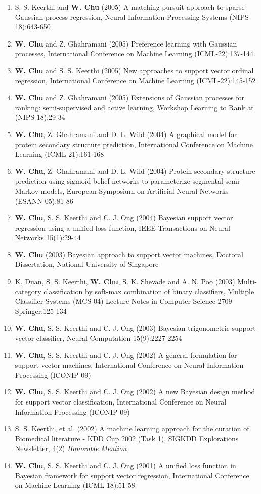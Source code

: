 \documentclass[line,10pt,final]{res}
\begin{document}
\begin{resume}
\begin{enumerate}
\item S. S. Keerthi and  {\bf W. Chu} (2005)  A matching pursuit approach to sparse Gaussian process regression, Neural Information Processing Systems (NIPS-18):643-650  
\item  {\bf W. Chu} and Z. Ghahramani (2005)  Preference learning with Gaussian processes, International Conference on Machine Learning (ICML-22):137-144  
\item  {\bf W. Chu} and S. S. Keerthi (2005)  New approaches to support vector ordinal regression,  International Conference on Machine Learning (ICML-22):145-152  
\item  {\bf W. Chu} and Z. Ghahramani (2005)  Extensions of Gaussian processes for ranking: semi-supervised and active learning, Workshop Learning to Rank at (NIPS-18):29-34  
\item  {\bf W. Chu}, Z. Ghahramani and D. L. Wild (2004)  A graphical model for protein secondary structure prediction,  International Conference on Machine Learning (ICML-21):161-168  
\item  {\bf W. Chu}, Z. Ghahramani and D. L. Wild (2004)  Protein secondary structure prediction using sigmoid belief networks to parameterize segmental semi-Markov models,  European Symposium on Artificial Neural Networks (ESANN-05):81-86
\item  {\bf W. Chu}, S. S. Keerthi and C. J. Ong (2004)  Bayesian support vector regression using a unified loss function,  IEEE Transactions on Neural Networks 15(1):29-44  
\item  {\bf W. Chu} (2003)  Bayesian approach to support vector machines, Doctoral Dissertation, National University of Singapore  
\item K. Duan, S. S. Keerthi,  {\bf W. Chu}, S. K. Shevade and A. N. Poo  (2003)  Multi-category classification by soft-max combination of binary classifiers,  Multiple Classifier Systems (MCS-04) Lecture Notes in Computer Science 2709   Springer:125-134
\item  {\bf W. Chu}, S. S. Keerthi and C. J. Ong (2003)  Bayesian trigonometric support vector classifier,  Neural Computation 15(9):2227-2254  
\item  {\bf W. Chu}, S. S. Keerthi and C. J. Ong (2002)  A general formulation for support vector machines,  International Conference on Neural Information Processing (ICONIP-09)
\item  {\bf W. Chu}, S. S. Keerthi and C. J. Ong (2002)  A new Bayesian design method for support vector classification,  International Conference on Neural Information Processing (ICONIP-09)
\item S. S. Keerthi, et al. (2002)  A machine learning approach for the curation of Biomedical literature - KDD Cup 2002 (Task 1),  SIGKDD Explorations Newsletter, 4(2)  {\em Honorable Mention}
\item  {\bf W. Chu}, S. S. Keerthi and C. J. Ong (2001)  A unified loss function in Bayesian framework for support vector regression,  International Conference on Machine Learning (ICML-18):51-58



\end{enumerate}
\end{resume}
\end{document}
